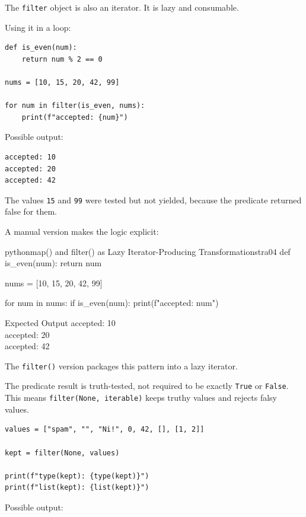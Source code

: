 The \texttt{filter} object is also an iterator. It is lazy and consumable.

Using it in a loop:

\begin{verbatim}
def is_even(num):
    return num % 2 == 0

nums = [10, 15, 20, 42, 99]

for num in filter(is_even, nums):
    print(f"accepted: {num}")
\end{verbatim}

Possible output:

\begin{verbatim}
accepted: 10
accepted: 20
accepted: 42
\end{verbatim}

The values \texttt{15} and \texttt{99} were tested but not yielded, because the predicate returned false for them.

A manual version makes the logic explicit:

\begin{codebox}[]{python}{map() and filter() as Lazy Iterator-Producing Transformations}{tra04}
def is_even(num):
    return num %

nums = [10, 15, 20, 42, 99]

for num in nums:
    if is_even(num):
        print(f"accepted: {num}")
\end{codebox}


\begin{iobox}{Expected Output}
accepted: 10 \\
accepted: 20 \\
accepted: 42 \\
\end{iobox}




The \texttt{filter()} version packages this pattern into a lazy iterator.

The predicate result is truth-tested, not required to be exactly \texttt{True} or \texttt{False}. This means \texttt{filter(None, iterable)} keeps truthy values and rejects falsy values.

\begin{verbatim}
values = ["spam", "", "Ni!", 0, 42, [], [1, 2]]

kept = filter(None, values)

print(f"type(kept): {type(kept)}")
print(f"list(kept): {list(kept)}")
\end{verbatim}

Possible output:

